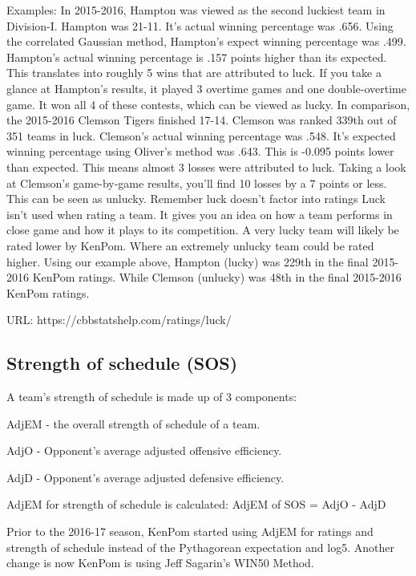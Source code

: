 \documentclass[
10pt, %
a4paper, %
oneside, %
headinclude,footinclude, %
BCOR5mm, %
]{scrartcl}
\begin{document}
\begin{description}
\begin{description}
Examples:
In 2015-2016, Hampton was viewed as the second luckiest team in Division-I.
Hampton was 21-11. It's actual winning percentage was .656.
Using the correlated Gaussian method, Hampton's expect winning percentage was .499.
Hampton's actual winning percentage is .157 points higher than its expected. This translates into roughly 5 wins that are attributed to luck.
If you take a glance at Hampton's results, it played 3 overtime games and one double-overtime game. It won all 4 of these contests, which can be viewed as lucky.
In comparison, the 2015-2016 Clemson Tigers finished 17-14. Clemson was ranked 339th out of 351 teams in luck.
Clemson's actual winning percentage was .548.
It's expected winning percentage using Oliver's method was .643.
This is -0.095 points lower than expected. This means almost 3 losses were attributed to luck.
Taking a look at Clemson's game-by-game results, you'll find 10 losses by a 7 points or less. This can be seen as unlucky.
Remember luck doesn't factor into ratings 
Luck isn't used when rating a team. It gives you an idea on how a team performs in close game and how it plays to its competition.
A very lucky team will likely be rated lower by KenPom.
Where an extremely unlucky team could be rated higher.
Using our example above, Hampton (lucky) was 229th in the final 2015-2016 KenPom ratings.
While Clemson (unlucky) was 48th in the final 2015-2016 KenPom ratings.

URL: https://cbbstatshelp.com/ratings/luck/
\end{description}

\subsection{Strength of schedule (SOS)}
\begin{description}
A team's strength of schedule is made up of 3 components:
\item AdjEM - the overall strength of schedule of a team.
\item AdjO - Opponent's average adjusted offensive efficiency.
\item AdjD - Opponent's average adjusted defensive efficiency.

AdjEM for strength of schedule is calculated:
AdjEM of SOS = AdjO - AdjD

Prior to the 2016-17 season, KenPom started using AdjEM for ratings and strength of schedule instead of the Pythagorean expectation and log5.
Another change is now KenPom is using Jeff Sagarin's WIN50 Method.


\end{description}
\end{description}
\end{document}
